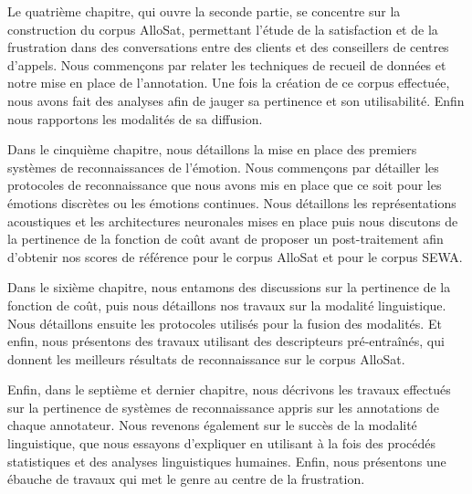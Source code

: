 Le quatrième chapitre, qui ouvre la seconde partie, se concentre sur la construction du corpus AlloSat, permettant l'étude de la satisfaction et de la frustration dans des conversations entre des clients et des conseillers de centres d'appels. Nous commençons par relater les techniques de recueil de données et notre mise en place de l'annotation. Une fois la création de ce corpus effectuée, nous avons fait des analyses afin de jauger sa pertinence et son utilisabilité. Enfin nous rapportons les modalités de sa diffusion.

Dans le cinquième chapitre, nous détaillons la mise en place des premiers systèmes de reconnaissances de l'émotion. Nous commençons par détailler les protocoles de reconnaissance que nous avons mis en place que ce soit pour les émotions discrètes ou les émotions continues. Nous détaillons les représentations acoustiques et les architectures neuronales mises en place puis nous discutons de la pertinence de la fonction de coût avant de proposer un post-traitement afin d'obtenir nos scores de référence pour le corpus AlloSat et pour le corpus SEWA.

Dans le sixième chapitre, nous entamons des discussions sur la pertinence de la fonction de coût, puis nous détaillons nos travaux sur la modalité linguistique. Nous détaillons ensuite les protocoles utilisés pour la fusion des modalités. Et enfin, nous présentons des travaux utilisant des descripteurs pré-entraînés, qui donnent les meilleurs résultats de reconnaissance sur le corpus AlloSat.

Enfin, dans le septième et dernier chapitre, nous décrivons les travaux effectués sur la pertinence de systèmes de reconnaissance appris sur les annotations de chaque annotateur. Nous revenons également sur le succès de la modalité linguistique, que nous essayons d'expliquer en utilisant à la fois des procédés statistiques et des analyses linguistiques humaines. Enfin, nous présentons une ébauche de travaux qui met le genre au centre de la frustration.
